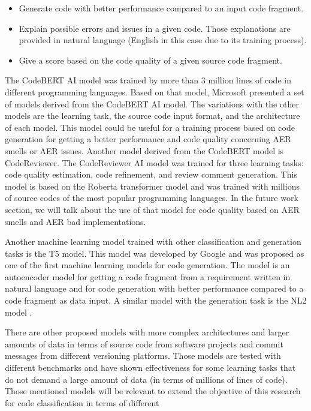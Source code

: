 \begin{itemize}
	\item Generate code with better performance compared to an input code fragment.
	\item Explain possible errors and issues in a given code. Those explanations are provided in natural language (English in this case due to its training process).
	\item Give a score based on the code quality of a given source code fragment.
\end{itemize}

The CodeBERT AI model was trained by more than 3 million lines of code in different programming languages. Based on that model, Microsoft presented a set of models derived from the CodeBERT AI model. The variations with the other models are the learning task, the source code input format, and the architecture of each model. This model could be useful for a training process based on code generation for getting a better performance and code quality concerning AER smells or AER issues.
Another model derived from the CodeBERT model is CodeReviewer. The CodeReviewer AI model was trained for three learning tasks: code quality estimation, code refinement, and review comment generation. This model is based on the Roberta transformer model and was trained with millions of source codes of the most popular programming languages. In the future work section, we will talk about the use of that model for code quality based on AER smells and AER bad implementations.


Another machine learning model trained with other classification and generation tasks is the T5 model. This model was developed by Google and was proposed as one of the first machine learning models for code generation. The model is an autoencoder model for getting a code fragment from a requirement written in natural language and for code generation with better performance compared to a code fragment as data input. A similar model with the generation task is the NL2 model \cite{nl2_model}.

There are other proposed models with more complex architectures and larger amounts of data in terms of source code from software projects and commit messages from different versioning platforms. Those models are tested with different benchmarks and have shown effectiveness for some learning tasks that do not demand a large amount of data (in terms of millions of lines of code). Those mentioned models will be relevant to extend the objective of this research for code classification in terms of different 



